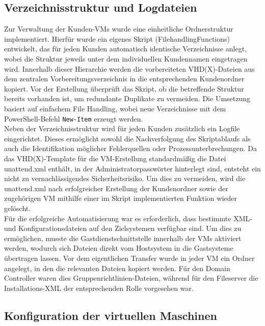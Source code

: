 \documentclass[a4paper,12pt]{article}
\begin{document}
\subsection{Verzeichnisstruktur und Logdateien}

Zur Verwaltung der Kunden-VMs wurde eine einheitliche Ordnerstruktur implementiert. 
Hierfür wurde ein eigenes Skript (FilehandlingFunctions) entwickelt, das für jeden Kunden automatisch identische Verzeichnisse anlegt, wobei die Struktur jeweils unter dem individuellen Kundennamen eingetragen wird. 
Innerhalb dieser Hierarchie werden die vorbereiteten VHD(X)-Dateien aus dem zentralen Vorbereitungsverzeichnis in die entsprechenden Kundenordner kopiert. 
Vor der Erstellung überprüft das Skript, ob die betreffende Struktur bereits vorhanden ist, um redundante Duplikate zu vermeiden. 
Die Umsetzung basiert auf einfachem File Handling, wobei neue Verzeichnisse mit dem PowerShell-Befehl \lstinline|New-Item| erzeugt werden.\\

Neben der Verzeichnisstruktur wird für jeden Kunden zusätzlich ein Logfile eingerichtet. 
Dieses ermöglicht sowohl die Nachverfolgung des Skriptablaufs als auch die Identifikation möglicher Fehlerquellen oder Prozessunterbrechungen. 
Da das VHD(X)-Template für die VM-Erstellung standardmäßig die Datei unattend.xml enthält, in der Administratorpasswörter hinterlegt sind, entsteht ein nicht zu vernachlässigendes Sicherheitsrisiko. 
Um dies zu vermeiden, wird die unattend.xml nach erfolgreicher Erstellung der Kundenordner sowie der zugehörigen VM mithilfe einer im Skript implementierten Funktion wieder gelöscht.\\

Für die erfolgreiche Automatisierung war es erforderlich, dass bestimmte XML- und Konfigurationsdateien auf den Zielsystemen verfügbar sind. 
Um dies zu ermöglichen, musste die Gastdienstschnittstelle innerhalb der VMs aktiviert werden, wodurch sich Dateien direkt vom Hostsystem in die Gastsysteme übertragen lassen. 
Vor dem eigentlichen Transfer wurde in jeder VM ein Ordner angelegt, in den die relevanten Dateien kopiert werden. 
Für den Domain Controller waren dies Gruppenrichtlinien-Dateien, während für den Fileserver die Installations-XML der entsprechenden Rolle vorgesehen war.\\

\subsection{Konfiguration der virtuellen Maschinen}
\end{document}
